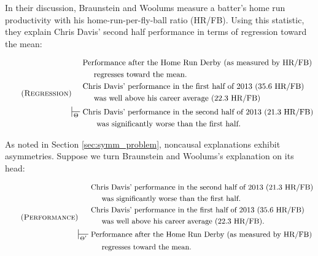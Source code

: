 \documentclass[natbib]{svjour3}                     %
\begin{document}
In their discussion, Braunstein and Woolums measure a batter's  home run productivity with his home-run-per-fly-ball ratio (HR/FB). Using this statistic, they explain Chris Davis' second half performance in terms of regression toward the mean:

\begin{equation}
\label{eq:regression}\tag{\textsc{Regression}}
	\begin{split}
	& \text{Performance after the Home Run Derby (as measured by HR/FB)} \\
	& \hspace{.5cm} \text{regresses toward the mean.} \\
	& \text{Chris Davis' performance in the first half of 2013 (35.6 HR/FB)} \\
	& \hspace{.5cm} \text{was well above his career average (22.3 HR/FB)} \\
	\sststile{\Theta}{}\,\, & \text{Chris Davis' performance in the second half of 2013 (21.3 HR/FB)} \\
	& \hspace{.5cm} \text{ was significantly worse than the first half.}
	\end{split}
\end{equation}


\noindent As noted in Section \ref{sec:symm_problem}, noncausal explanations exhibit asymmetries. Suppose we turn Braunstein and Woolums's explanation on its head:   

\begin{equation}
\label{eq:performance}\tag{\textsc{Performance}}
	\begin{split}
	& \text{Chris Davis' performance in the second half of 2013 (21.3 HR/FB)} \\
	& \hspace{.5cm} \text{was significantly worse than the first half.}  \\
	& \text{Chris Davis' performance in the first half of 2013 (35.6 HR/FB)} \\
	& \hspace{.5cm} \text{was well above his career average (22.3 HR/FB).} \\
	\sststile{\Theta'}{}\,\,&\text{Performance after the Home Run Derby (as measured by HR/FB)} \\
	& \hspace{.5cm} \text{regresses toward the mean.} 
	\end{split}
\end{equation}
\end{document}
